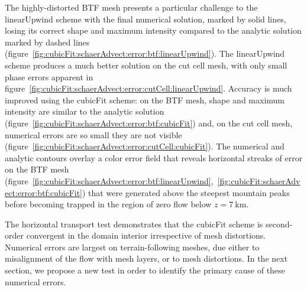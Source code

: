 The highly-distorted BTF mesh presents a particular challenge to the linearUpwind scheme with the final numerical solution, marked by solid lines, losing its correct shape and maximum intensity compared to the analytic solution marked by dashed lines (figure~\ref{fig:cubicFit:schaerAdvect:error:btf:linearUpwind}).
The linearUpwind scheme produces a much better solution on the cut cell mesh, with only small phase errors apparent in figure~\ref{fig:cubicFit:schaerAdvect:error:cutCell:linearUpwind}.
Accuracy is much improved using the cubicFit scheme: on the BTF mesh, shape and maximum intensity are similar to the analytic solution (figure~\ref{fig:cubicFit:schaerAdvect:error:btf:cubicFit}) and, on the cut cell mesh, numerical errors are so small they are not visible (figure~\ref{fig:cubicFit:schaerAdvect:error:cutCell:cubicFit}).
The numerical and analytic contours overlay a color error field that reveals horizontal streaks of error on the BTF mesh (figure~\ref{fig:cubicFit:schaerAdvect:error:btf:linearUpwind},~\ref{fig:cubicFit:schaerAdvect:error:btf:cubicFit}) that were generated above the steepest mountain peaks before becoming trapped in the region of zero flow below $z = \SI{7}{\kilo\meter}$.

The horizontal transport test demonstrates that the cubicFit scheme is second-order convergent in the domain interior irrespective of mesh distortions.  Numerical errors are largest on terrain-following meshes, due either to misalignment of the flow with mesh layers, or to mesh distortions.
In the next section, we propose a new test in order to identify the primary cause of these numerical errors.
